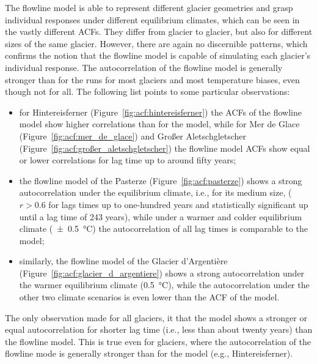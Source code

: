       The flowline model is able to represent different glacier geometries and grasp individual responses under different equilibrium climates, which can be seen in the vastly different ACFs. They differ from glacier to glacier, but also for different sizes of the same glacier. However, there are again no discernible patterns, which confirms the notion that the flowline model is capable of simulating each glacier's individual response. The autocorrelation of the flowline model is generally stronger than for the \vas{} runs for most glaciers and most temperature biases, even though not for all. The following list points to some particular observations:
      \begin{itemize}
        \item for Hintereisferner (Figure~\ref{fig:acf:hintereisferner}) the ACFs of the flowline model show higher correlations than for the \vas{} model, while for Mer de Glace (Figure~\ref{fig:acf:mer_de_glace}) and Großer Aletschgletscher (Figure~\ref{fig:acf:großer_aletschgletscher}) the flowline model ACFs show equal or lower correlations for lag time up to around fifty years;
        \item the flowline model of the Pasterze (Figure~\ref{fig:acf:pasterze}) shows a strong autocorrelation under the equilibrium climate, i.e., for its medium size, ($r>0.6$ for lags times up to one-hundred years and statistically significant up until a lag time of 243 years), while under a warmer and colder equilibrium climate (\SI{\pm0.5}{\celsius}) the autocorrelation of all lag times is comparable to the \vas{} model;
        \item similarly, the flowline model of the Glacier d'Argentière (Figure~\ref{fig:acf:glacier_d_argentiere}) shows a strong autocorrelation under the warmer equilibrium climate (\SI{+0.5}{\celsius}), while the autocorrelation under the other two climate scenarios is even lower than the ACF of the \vas{} model.
      \end{itemize}
      The only observation made for all glaciers, it that the \vas{} model shows a stronger or equal autocorrelation for shorter lag time (i.e., less than about twenty years) than the flowline model. This is true even for glaciers, where the autocorrelation of the flowline mode is generally stronger than for the \vas{} model (e.g., Hintereisferner).

